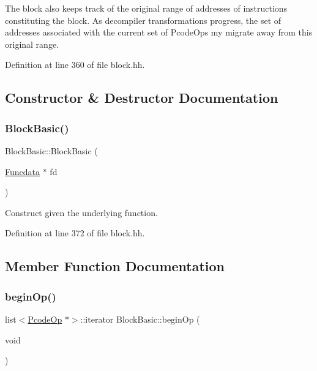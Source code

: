 The block also keeps track of the original range of addresses of instructions constituting the block. As decompiler transformations progress, the set of addresses associated with the current set of Pcode\+Ops my migrate away from this original range. 

Definition at line 360 of file block.\+hh.



\subsection{Constructor \& Destructor Documentation}
\mbox{\label{class_block_basic_a2e2866c010ac4530780a5ed3b9fbca92}} 
\subsubsection{\texorpdfstring{BlockBasic()}{BlockBasic()}}
{\footnotesize\ttfamily Block\+Basic\+::\+Block\+Basic (\begin{DoxyParamCaption}\item[{\mbox{\hyperlink{class_funcdata}{Funcdata}} $\ast$}]{fd }\end{DoxyParamCaption})\hspace{0.3cm}{\ttfamily [inline]}}



Construct given the underlying function. 



Definition at line 372 of file block.\+hh.



\subsection{Member Function Documentation}
\mbox{\label{class_block_basic_a3ddd779a5af8cb12e6fc069bd49ddb6c}} 
\subsubsection{\texorpdfstring{beginOp()}{beginOp()}\hspace{0.1cm}{\footnotesize\ttfamily [1/2]}}
{\footnotesize\ttfamily list$<$\mbox{\hyperlink{class_pcode_op}{Pcode\+Op}} $\ast$$>$\+::iterator Block\+Basic\+::begin\+Op (\begin{DoxyParamCaption}\item[{void}]{ }\end{DoxyParamCaption})\hspace{0.3cm}{\ttfamily [inline]}}



